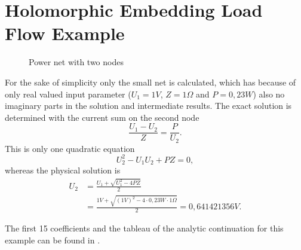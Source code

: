 \chapter{Holomorphic Embedding Load Flow Example}
\label{chap:helm_example}

\begin{figure}
	\centering
	
	\caption{Power net with two nodes}
	\label{fig:two_node_net}
\end{figure}

For the sake of simplicity only the small net  is calculated, which has because of only real valued input parameter ($U_1 = \si{1}{V}$, $Z = \si{1}{\Omega}$ and $P = \si{0,23}{W}$) also no imaginary parts in the solution and intermediate results. The exact solution is determined with the current sum on the second node
\begin{equation}
	\frac{U_1 - U_2}{Z} = \frac{P}{U_2}.
\end{equation}
This is only one quadratic equation
\begin{equation}
	U_2^2 - U_1 U_2 + P Z = 0,
\end{equation}
whereas the physical solution is
\begin{align}
	U_2 & = \frac{U_1 + \sqrt{U_1^2 - 4 P Z}}{2} \\
		& = \frac{\si{1}{V} + \sqrt{(\si{1}{V})^2 - 4 \cdot \si{0,23}{W} \cdot \si{1}{\Omega}}}{2} = \si{0,641421356}{V}.
\end{align}

The first 15 coefficients and the tableau of the analytic continuation for this example can be found in .

